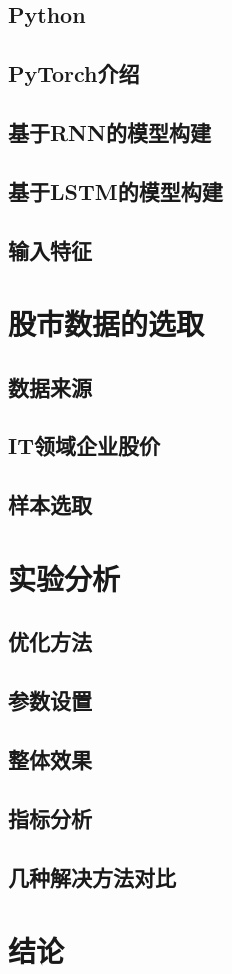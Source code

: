 \documentclass[UTF8]{ctexart}
\begin{document}
\subsection{Python}
\subsection{PyTorch介绍}
\subsection{基于RNN的模型构建}
\subsection{基于LSTM的模型构建}
\subsection{输入特征}
\section{股市数据的选取}
\subsection{数据来源}
\subsection{IT领域企业股价}
\subsection{样本选取}
\section{实验分析}
\subsection{优化方法}
\subsection{参数设置}
\subsection{整体效果}
\subsection{指标分析}
\subsection{几种解决方法对比}
\section{结论}
\end{document}
